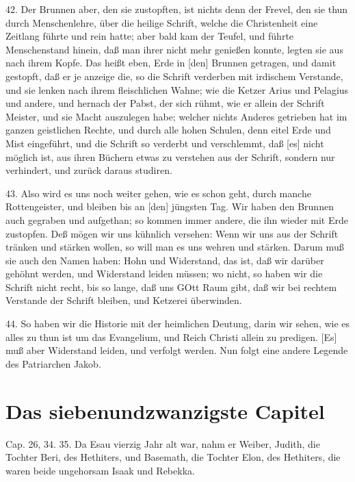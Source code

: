 42. Der Brunnen aber, den sie zustopften, ist nichts denn der Frevel, den sie thun durch Menschenlehre, über die heilige Schrift, welche die Christenheit eine Zeitlang führte und rein hatte; aber bald kam der Teufel, und führte Menschenstand hinein, daß man ihrer nicht mehr genießen konnte, legten sie aus nach ihrem Kopfe. Das heißt eben, Erde in [den] Brunnen getragen, und damit gestopft, daß er je anzeige die, so die Schrift verderben mit irdischem Verstande, und sie lenken nach ihrem fleischlichen Wahne; wie die Ketzer Arius und Pelagius und andere, und hernach der Pabst, der sich rühmt, wie er allein der Schrift Meister, und sie Macht auszulegen habe; welcher nichts Anderes getrieben hat im ganzen geistlichen Rechte, und durch alle hohen Schulen, denn eitel Erde und Mist eingeführt, und die Schrift so verderbt und verschlemmt, daß [es] nicht möglich ist, aus ihren Büchern etwas zu verstehen aus der Schrift, sondern nur verhindert, und zurück daraus studiren.

43. Also wird es uns noch weiter gehen, wie es schon geht, durch manche Rottengeister, und bleiben bis an [den] jüngsten Tag. Wir haben den Brunnen auch gegraben und aufgethan; so kommen immer andere, die ihn wieder mit Erde zustopfen. Deß mögen wir uns kühnlich versehen: Wenn wir uns aus der Schrift tränken und stärken wollen, so will man es uns wehren und stärken. Darum muß sie auch den Namen haben: Hohn und Widerstand, das ist, daß wir darüber gehöhnt werden, und Widerstand leiden müssen; wo nicht, so haben wir die Schrift nicht recht, bis so lange, daß uns GOtt Raum gibt, daß wir bei rechtem Verstande der Schrift bleiben, und Ketzerei überwinden.

44. So haben wir die Historie mit der heimlichen Deutung, darin wir sehen, wie es alles zu thun ist um das Evangelium, und Reich Christi allein zu predigen. [Es] muß aber Widerstand leiden, und verfolgt werden. Nun folgt eine andere Legende des Patriarchen Jakob.

\section{Das siebenundzwanzigste Capitel}

Cap. 26, 34. 35. Da Esau vierzig Jahr alt war, nahm er Weiber, Judith, die Tochter Beri, des Hethiters, und Basemath, die Tochter Elon, des Hethiters, die waren beide ungehorsam Isaak und Rebekka.

